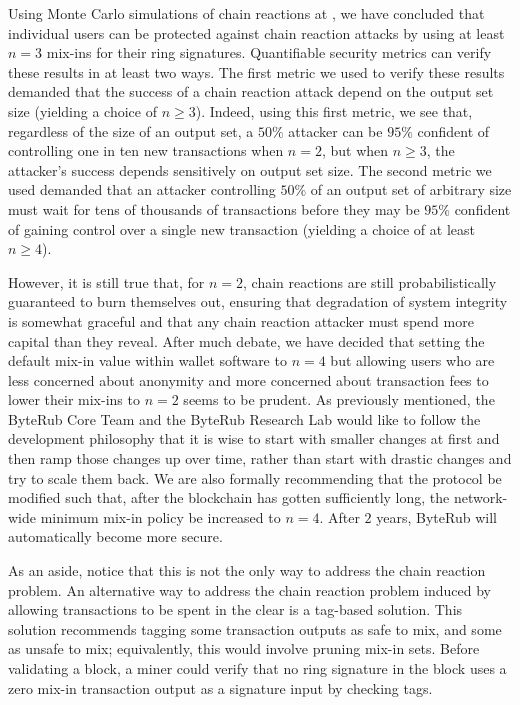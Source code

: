 \documentclass[12pt,english]{mrl}
\theoremstyle{definition}
\renewcommand{\geq}{\geqslant}
\numberwithin{equation}{section}
\numberwithin{figure}{section}
\numberwithin{equation}{section}
\numberwithin{equation}{section}
\numberwithin{figure}{section}
\begin{document}
Using Monte Carlo simulations of chain reactions at \cite{saturationUTXO}, we have concluded that individual users can be protected against chain reaction attacks by using at least $n=3$ mix-ins for their ring signatures. Quantifiable security metrics can verify these results in at least two ways. The first metric we used to verify these results demanded that the success of a chain reaction attack depend on the output set size (yielding a choice of $n \geq 3$). Indeed, using this first metric, we see that, regardless of the size of an output set, a $50\%$ attacker can be $95\%$ confident of controlling one in ten new transactions when $n=2$, but when $n\geq 3$, the attacker's success depends sensitively on output set size. The second metric we used demanded that an attacker controlling $50\%$ of an output set of arbitrary size must wait for tens of thousands of transactions before they may be $95\%$ confident of gaining control over a single new transaction (yielding a choice of at least $n \geq 4$).

However, it is still true that, for $n=2$, chain reactions are still probabilistically guaranteed to burn themselves out, ensuring that degradation of system integrity is somewhat graceful and that any chain reaction attacker must spend more capital than they reveal. After much debate, we have decided that setting the default mix-in value within wallet software to $n=4$ but allowing users who are less concerned about anonymity and more concerned about transaction fees to lower their mix-ins to $n=2$ seems to be prudent. As previously mentioned, the ByteRub Core Team and the ByteRub Research Lab would like to follow the development philosophy that it is wise to start with smaller changes at first and then ramp those changes up over time, rather than start with drastic changes and try to scale them back. We are also formally recommending that the protocol be modified such that, after the blockchain has gotten sufficiently long, the network-wide minimum mix-in policy be increased to $n=4$. After $2$ years, ByteRub will automatically become more secure.

As an aside, notice that this is not the only way to address the chain reaction problem. An alternative way to address the chain reaction problem induced by allowing transactions to be spent in the clear is a tag-based solution. This solution recommends tagging some transaction outputs as safe to mix, and some as unsafe to mix; equivalently, this would involve pruning mix-in sets. Before validating a block, a miner could verify that no ring signature in the block uses a zero mix-in transaction output as a signature input by checking tags.
\end{document}
